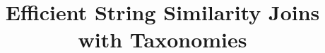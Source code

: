 \documentclass{sig-alternate}
\begin{document}


\title{Efficient String Similarity Joins with Taxonomies}


\author{
}




\maketitle
\end{document}
